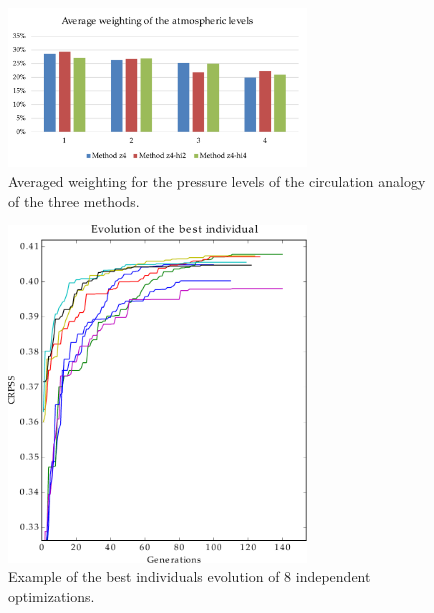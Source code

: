 \documentclass[twocol]{ametsoc}
\begin{document}
\begin{figure}[htb]
	\centerline{\includegraphics[width=7.9cm]{figures/figure_levels_weights_average.pdf}}
	\caption{Averaged weighting for the pressure levels of the circulation analogy of the three methods.}
	\label{fig:levels_weights_average}
\end{figure}

\begin{figure}[htb]
	\centerline{\includegraphics[width=7.9cm]{figures/figure_evolution.pdf}}
	\caption{Example of the best individuals evolution of 8 independent optimizations.}
	\label{fig:evolution}
\end{figure}
\end{document}
